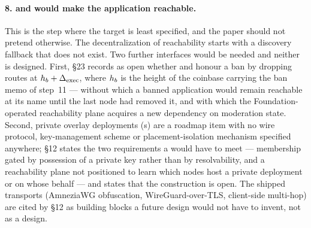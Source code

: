 \paragraph{8. \FDM and \PDNS would make the application reachable.}
This is the step where the target is least specified, and the paper should not pretend otherwise. The
decentralization of reachability starts with a discovery fallback that does not exist. Two further
interfaces would be needed and neither is designed. First, \S23 records as open whether \FDM and
\PDNS honour a ban by dropping routes at $h_b + \Delta_{\mathrm{exec}}$, where $h_b$ is the
height of the coinbase carrying the ban memo of step~11 --- without which a banned application would
remain reachable at its name until the last node had removed it, and with which the
Foundation-operated reachability plane acquires a new dependency on moderation state. Second, private overlay deployments (\VPON s) are a roadmap item with no wire
protocol, key-management scheme or placement-isolation mechanism specified anywhere; \S12 states the
two requirements a \VPON would have to meet --- membership gated by possession of a private key
rather than by resolvability, and a reachability plane not positioned to learn which nodes host a
private deployment or on whose behalf --- and states that the construction is open. The shipped
\CumulusVPN transports (AmneziaWG obfuscation, WireGuard-over-TLS, client-side multi-hop) are cited
by \S12 as building blocks a future design would not have to invent, not as a design.

